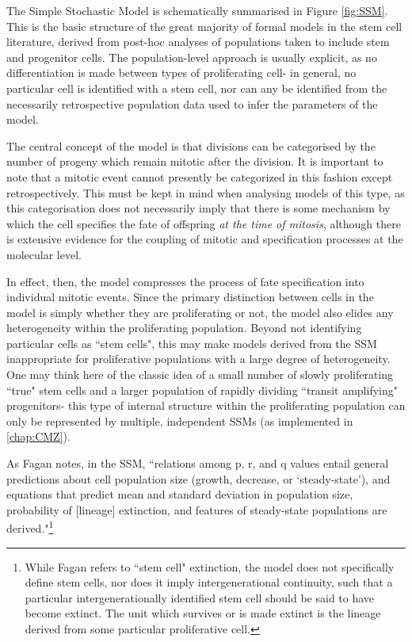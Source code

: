 The Simple Stochastic Model is schematically summarised in Figure \ref{fig:SSM}. This is the basic structure of the great majority of formal models in the stem cell literature, derived from post-hoc analyses of populations taken to include stem and progenitor cells. The population-level approach is usually explicit, as no differentiation is made between types of proliferating cell- in general, no particular cell is identified with a stem cell, nor can any be identified from the necessarily retrospective population data used to infer the parameters of the model. 

The central concept of the model is that divisions can be categorised by the number of progeny which remain mitotic after the division. It is important to note that a mitotic event cannot presently be categorized in this fashion except retrospectively. This must be kept in mind when analysing models of this type, as this categorisation does not necessarily imply that there is some mechanism by which the cell specifies the fate of offspring \textit{at the time of mitosis}, although there is extensive evidence for the coupling of mitotic and specification processes at the molecular level.

In effect, then, the model compresses the process of fate specification into individual mitotic events. Since the primary distinction between cells in the model is simply whether they are proliferating or not, the model also elides any heterogeneity within the proliferating population. Beyond not identifying particular cells as ``stem cells", this may make models derived from the SSM inappropriate for proliferative populations with a large degree of heterogeneity. One may think here of the classic idea of a small number of slowly proliferating ``true" stem cells and a larger population of rapidly dividing ``transit amplifying" progenitors- this type of internal structure within the proliferating population can only be represented by multiple, independent SSMs (as implemented in \autoref{chap:CMZ}).

As Fagan notes, in the SSM, ``relations among p, r, and q values entail general predictions about cell population size (growth, decrease, or ‘steady-state’), and equations that predict mean and standard deviation in population size, probability of [lineage] extinction, and features of steady-state populations are derived."\footnote{While Fagan refers to ``stem cell" extinction, the model does not specifically define stem cells, nor does it imply intergenerational continuity, such that a particular intergenerationally identified stem cell should be said to have become extinct. The unit which survives or is made extinct is the lineage derived from some particular proliferative cell.}\cite[p.60]{Fagan2013}

